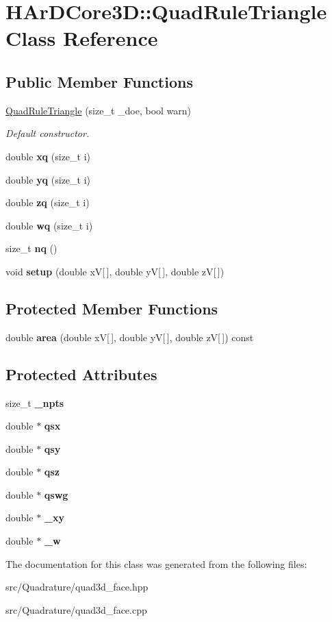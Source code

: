 \hypertarget{classHArDCore3D_1_1QuadRuleTriangle}{}\section{H\+Ar\+D\+Core3D\+:\+:Quad\+Rule\+Triangle Class Reference}
\label{classHArDCore3D_1_1QuadRuleTriangle}
\subsection*{Public Member Functions}
\begin{DoxyCompactItemize}
\item 
\hyperlink{group__Quadratures_ga0d95447bb72cfc1b19cd2ea192ff6695}{Quad\+Rule\+Triangle} (size\+\_\+t \+\_\+doe, bool warn)
\begin{DoxyCompactList}\small\item\em Default constructor. \end{DoxyCompactList}\item 
double {\bfseries xq} (size\+\_\+t i)
\item 
double {\bfseries yq} (size\+\_\+t i)
\item 
double {\bfseries zq} (size\+\_\+t i)
\item 
double {\bfseries wq} (size\+\_\+t i)
\item 
size\+\_\+t {\bfseries nq} ()
\item 
void {\bfseries setup} (double xV\mbox{[}$\,$\mbox{]}, double yV\mbox{[}$\,$\mbox{]}, double zV\mbox{[}$\,$\mbox{]})
\end{DoxyCompactItemize}
\subsection*{Protected Member Functions}
\begin{DoxyCompactItemize}
\item 
double {\bfseries area} (double xV\mbox{[}$\,$\mbox{]}, double yV\mbox{[}$\,$\mbox{]}, double zV\mbox{[}$\,$\mbox{]}) const
\end{DoxyCompactItemize}
\subsection*{Protected Attributes}
\begin{DoxyCompactItemize}
\item 
size\+\_\+t {\bfseries \+\_\+npts}
\item 
double $\ast$ {\bfseries qsx}
\item 
double $\ast$ {\bfseries qsy}
\item 
double $\ast$ {\bfseries qsz}
\item 
double $\ast$ {\bfseries qswg}
\item 
double $\ast$ {\bfseries \+\_\+xy}
\item 
double $\ast$ {\bfseries \+\_\+w}
\end{DoxyCompactItemize}


The documentation for this class was generated from the following files\+:\begin{DoxyCompactItemize}
\item 
src/\+Quadrature/quad3d\+\_\+face.\+hpp\item 
src/\+Quadrature/quad3d\+\_\+face.\+cpp\end{DoxyCompactItemize}
